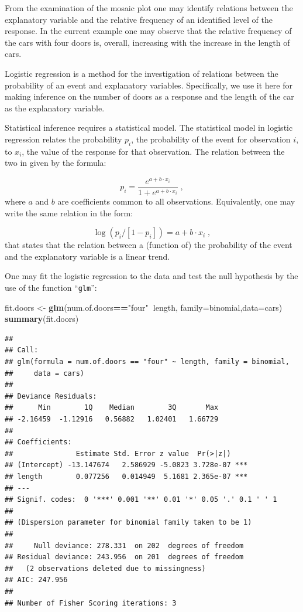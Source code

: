 \documentclass[]{krantz}
\makeatletter
\newenvironment{Shaded}{\begin{snugshade}}{\end{snugshade}}
\newcommand{\DataTypeTok}[1]{\textcolor[rgb]{0.13,0.29,0.53}{#1}}
\newcommand{\KeywordTok}[1]{\textcolor[rgb]{0.13,0.29,0.53}{\textbf{#1}}}
\newcommand{\NormalTok}[1]{#1}
\newcommand{\OperatorTok}[1]{\textcolor[rgb]{0.81,0.36,0.00}{\textbf{#1}}}
\newcommand{\StringTok}[1]{\textcolor[rgb]{0.31,0.60,0.02}{#1}}
\newenvironment{kframe}{%
\medskip{}
\setlength{\fboxsep}{.8em}
 \def\at@end@of@kframe{}%
 \ifinner\ifhmode%
  \def\at@end@of@kframe{\end{minipage}}%
  \begin{minipage}{\columnwidth}%
 \fi\fi%
 \def\FrameCommand##1{\hskip\@totalleftmargin \hskip-\fboxsep
 \colorbox{shadecolor}{##1}\hskip-\fboxsep
     \hskip-\linewidth \hskip-\@totalleftmargin \hskip\columnwidth}%
 \MakeFramed {\advance\hsize-\width
   \@totalleftmargin\z@ \linewidth\hsize
   \@setminipage}}%
 {\par\unskip\endMakeFramed%
 \at@end@of@kframe}
\renewenvironment{Shaded}{\begin{kframe}}{\end{kframe}}
\theoremstyle{definition}
\theoremstyle{definition}
\theoremstyle{definition}
\theoremstyle{remark}
\makeatother
\begin{document}
From the examination of the mosaic plot one may identify relations
between the explanatory variable and the relative frequency of an
identified level of the response. In the current example one may observe
that the relative frequency of the cars with four doors is, overall,
increasing with the increase in the length of cars.

Logistic regression is a method for the investigation of relations
between the probability of an event and explanatory variables.
Specifically, we use it here for making inference on the number of doors
as a response and the length of the car as the explanatory variable.

Statistical inference requires a statistical model. The statistical
model in logistic regression relates the probability \(p_i\), the
probability of the event for observation \(i\), to \(x_i\), the value of the
response for that observation. The relation between the two in given by
the formula:

\[p_i = \frac{e^{a + b \cdot x_i}}{1 + e^{a + b\cdot x_i}}\;,\] where
\(a\) and \(b\) are coefficients common to all observations. Equivalently,
one may write the same relation in the form:

\[\log(p_i/[1-p_i]) = a + b\cdot x_i\;,\] that states that the relation
between a (function of) the probability of the event and the explanatory
variable is a linear trend.

One may fit the logistic regression to the data and test the null
hypothesis by the use of the function ``\texttt{glm}'':

\begin{Shaded}
\begin{Highlighting}[]
\NormalTok{fit.doors <-}\StringTok{ }\KeywordTok{glm}\NormalTok{(num.of.doors}\OperatorTok{==}\StringTok{"four"}\OperatorTok{~}\NormalTok{length, }\DataTypeTok{family=}\NormalTok{binomial,}\DataTypeTok{data=}\NormalTok{cars)}
\KeywordTok{summary}\NormalTok{(fit.doors)}
\end{Highlighting}
\end{Shaded}

\begin{verbatim}
## 
## Call:
## glm(formula = num.of.doors == "four" ~ length, family = binomial, 
##     data = cars)
## 
## Deviance Residuals: 
##      Min        1Q    Median        3Q       Max  
## -2.16459  -1.12916   0.56882   1.02401   1.66729  
## 
## Coefficients:
##               Estimate Std. Error z value  Pr(>|z|)    
## (Intercept) -13.147674   2.586929 -5.0823 3.728e-07 ***
## length        0.077256   0.014949  5.1681 2.365e-07 ***
## ---
## Signif. codes:  0 '***' 0.001 '**' 0.01 '*' 0.05 '.' 0.1 ' ' 1
## 
## (Dispersion parameter for binomial family taken to be 1)
## 
##     Null deviance: 278.331  on 202  degrees of freedom
## Residual deviance: 243.956  on 201  degrees of freedom
##   (2 observations deleted due to missingness)
## AIC: 247.956
## 
## Number of Fisher Scoring iterations: 3
\end{verbatim}
\end{document}
